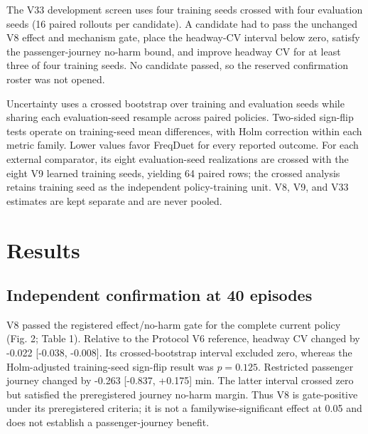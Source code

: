 \documentclass[preprint,12pt,authoryear,nopreprintline]{elsarticle}
\begin{document}
The V33 development screen uses four training seeds crossed with four
evaluation seeds (16 paired rollouts per candidate). A candidate had to
pass the unchanged V8 effect and mechanism gate, place the headway-CV
interval below zero, satisfy the passenger-journey no-harm bound, and
improve headway CV for at least three of four training seeds. No
candidate passed, so the reserved confirmation roster was not opened.

Uncertainty uses a crossed bootstrap over training and evaluation seeds
while sharing each evaluation-seed resample across paired policies.
Two-sided sign-flip tests operate on training-seed mean differences,
with Holm correction within each metric family. Lower values favor
FreqDuet for every reported outcome. For each external comparator, its
eight evaluation-seed realizations are crossed with the eight V9 learned
training seeds, yielding 64 paired rows; the crossed analysis retains
training seed as the independent policy-training unit. V8, V9, and V33
estimates are kept separate and are never pooled.

\section{Results}\label{results}

\subsection{Independent confirmation at 40
episodes}\label{independent-confirmation-at-40-episodes}

V8 passed the registered effect/no-harm gate for the complete current
policy (Fig. 2; Table 1). Relative to the Protocol V6 reference, headway
CV changed by -0.022 {[}-0.038, -0.008{]}. Its crossed-bootstrap
interval excluded zero, whereas the Holm-adjusted training-seed
sign-flip result was \(p=0.125\). Restricted passenger journey changed
by -0.263 {[}-0.837, +0.175{]} min. The latter interval crossed zero but
satisfied the preregistered journey no-harm margin. Thus V8 is
gate-positive under its preregistered criteria; it is not a
familywise-significant effect at 0.05 and does not establish a
passenger-journey benefit.
\end{document}
